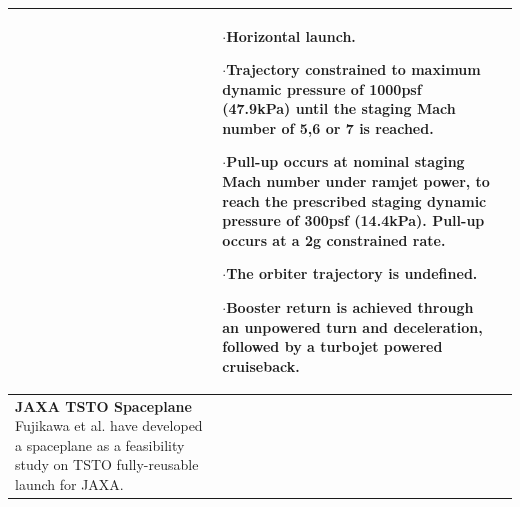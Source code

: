 {\begin{landscape}
\begin{xltabular}{\linewidth}{|X|X|X|}
	
	&\small
	
	$\cdot$Horizontal launch.
	
	$\cdot$Trajectory constrained to maximum dynamic pressure of 1000psf (47.9kPa) until the staging Mach number of 5,6 or 7 is reached. 
	
	$\cdot$Pull-up occurs at nominal staging Mach number under ramjet power, to reach the prescribed staging dynamic pressure of 300psf (14.4kPa). Pull-up occurs at a 2g constrained rate. 
	
	$\cdot$The orbiter trajectory is undefined.
	
	$\cdot$Booster return is achieved through an unpowered turn and deceleration, followed by a turbojet powered cruiseback. 
	\\
	
	
	\hline \small 
	\textbf{JAXA TSTO Spaceplane}\cite{Tsuchiya2005}\newline\newline
	Fujikawa et al.\cite{Fujikawa2017} have developed a spaceplane as a feasibility study on TSTO fully-reusable launch for JAXA. 
	
	&\small
	

\end{xltabular}
\end{landscape}}
